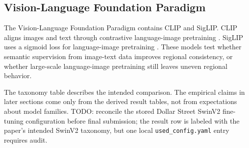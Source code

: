 \subsection{Vision-Language Foundation Paradigm}

The Vision-Language Foundation Paradigm contains CLIP and SigLIP. CLIP aligns images and text through contrastive language-image pretraining \citep{radford2021clip}. SigLIP uses a sigmoid loss for language-image pretraining \citep{zhai2023siglip}. These models test whether semantic supervision from image-text data improves regional consistency, or whether large-scale language-image pretraining still leaves uneven regional behavior.



The taxonomy table describes the intended comparison. The empirical claims in later sections come only from the derived result tables, not from expectations about model families. TODO: reconcile the stored Dollar Street SwinV2 fine-tuning configuration before final submission; the result row is labeled with the paper's intended SwinV2 taxonomy, but one local \texttt{used\_config.yaml} entry requires audit.

